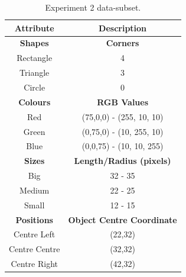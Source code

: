 \begin{table}[ht]
\centering
\begin{tabular}{|c|c|}
\hline
\textbf{Attribute} & \textbf{Description} \\ \hline \hline
\textbf{Shapes} & \textbf{Corners} \\ \hline
Rectangle & 4\\ \hline
Triangle & 3\\ \hline
Circle & 0\\ \hline 

\textbf{Colours} & \textbf{RGB Values}	\\ \hline	
Red & (75,0,0) - (255, 10, 10)\\ \hline
Green  & (0,75,0) - (10, 255, 10)\\ \hline
Blue   & (0,0,75) - (10, 10, 255)\\ \hline


\textbf{Sizes} & 	\textbf{Length/Radius (pixels)} \\ \hline			  
Big    & 32 - 35  \\ \hline
Medium & 22 - 25 \\ \hline
Small  & 12 - 15 \\ \hline 

\textbf{Positions} & \textbf{Object Centre Coordinate}	\\ \hline					  
Centre Left &(22,32)\\ \hline
Centre Centre & (32,32)\\ \hline
Centre Right &(42,32)\\ \hline				
\end{tabular}
\caption{Experiment 2 data-subset.}
\label{tab:exp2_data} 
\end{table}




